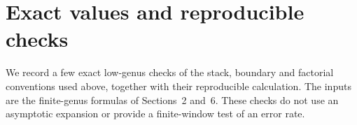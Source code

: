 \section{Exact values and reproducible checks}
\label{sec:appendix-c}

We record a few exact low-genus checks of the stack, boundary and
factorial conventions used above, together with their reproducible
calculation. The inputs are the finite-genus formulas of
Sections~2 and~6. These checks do not use an asymptotic expansion
or provide a finite-window test of an error rate.



